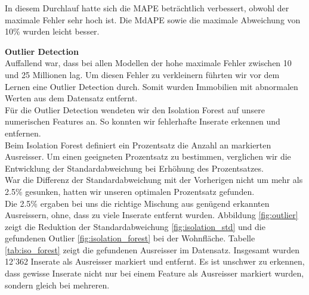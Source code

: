 \begin{table}[ht]
\centering
{}
\caption{Ergebnisse mit Einbezug der Lärmbelastung}
\label{tab:fourth_round}
\end{table}

In diesem Durchlauf hatte sich die MAPE beträchtlich verbessert, obwohl der maximale Fehler sehr hoch ist. Die MdAPE sowie die maximale Abweichung von 10\% wurden leicht besser.

\newpage
\textbf{Outlier Detection}\\
Auffallend war, dass bei allen Modellen der hohe maximale Fehler zwischen 10 und 25 Millionen lag. Um diesen Fehler zu verkleinern führten wir vor dem Lernen eine Outlier Detection durch. Somit wurden Immobilien mit abnormalen Werten aus dem Datensatz entfernt.\\
Für die Outlier Detection wendeten wir den Isolation Forest auf unsere numerischen Features an. So konnten wir fehlerhafte Inserate erkennen und entfernen.\\[2ex]
%
Beim Isolation Forest definiert ein Prozentsatz die Anzahl an markierten Ausreisser.
Um einen geeigneten Prozentsatz zu bestimmen, verglichen wir die Entwicklung der Standardabweichung bei Erhöhung des Prozentsatzes.\\
War die Differenz der Standardabweichung mit der Vorherigen nicht um mehr als 2.5\% gesunken, hatten wir unseren optimalen Prozentsatz gefunden.\\
Die 2.5\% ergaben bei uns die richtige Mischung aus genügend erkannten Ausreissern, ohne, dass zu viele Inserate entfernt wurden.
Abbildung \ref{fig:outlier} zeigt die Reduktion der Standardabweichung \ref{fig:isolation_std} und die gefundenen Outlier \ref{fig:isolation_forest} bei der Wohnfläche. Tabelle \ref{tab:iso_forest} zeigt die gefundenen Ausreisser im Datensatz. Insgesamt wurden 12'362 Inserate als Ausreisser markiert und entfernt.
Es ist unschwer zu erkennen, dass gewisse Inserate nicht nur bei einem Feature als Ausreisser markiert wurden, sondern gleich bei mehreren.

